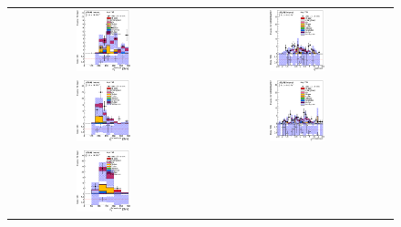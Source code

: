 \clearpage
\begin{figure}[htbp]
\begin{center}
\begin{tabular}{cc}
%
\includegraphics[width=0.30\textwidth]{appendices/figures/sdrs/JetPt1_ELEMUONCR9_1W_NOMINAL.eps} &
\includegraphics[width=0.30\textwidth]{appendices/figures/sdrs/JetEta1_ELEMUONCR9_1W_NOMINAL.eps} \\
\includegraphics[width=0.30\textwidth]{appendices/figures/sdrs/JetPt2_ELEMUONCR9_1W_NOMINAL.eps} &
\includegraphics[width=0.30\textwidth]{appendices/figures/sdrs/JetEta2_ELEMUONCR9_1W_NOMINAL.eps} \\
\includegraphics[width=0.30\textwidth]{appendices/figures/sdrs/JetPt3_ELEMUONCR9_1W_NOMINAL.eps} &

\end{tabular}
\end{center}
\end{figure}
